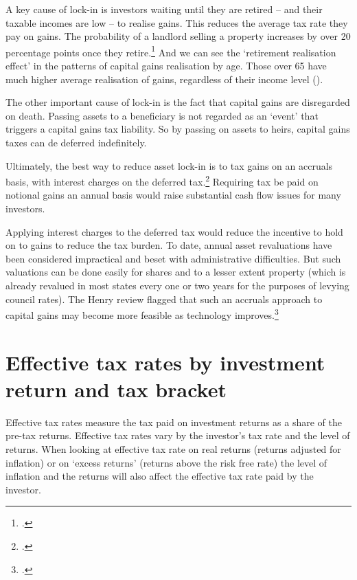 \begin{subappendices}
A key cause of lock-in is investors waiting until they are retired – and their taxable incomes are low – to realise gains. This reduces the average tax rate they pay on gains. The probability of a landlord selling a property increases by over 20 percentage points once they retire.\footcite{WoodOng2010}  And we can see the ‘retirement realisation effect’ in the patterns of capital gains realisation by age. Those over 65 have much higher average realisation of gains, regardless of their income level (). 

The other important cause of lock-in is the fact that capital gains are disregarded on death. Passing assets to a beneficiary is not regarded as an ‘event’ that triggers a capital gains tax liability. So by passing on assets to heirs, capital gains taxes can de deferred indefinitely. 

Ultimately, the best way to reduce asset lock-in is to tax gains on an accruals basis, with interest charges on the deferred tax.\footcites[][11--14]{Burman2009}[][12]{Ingles2009a}  Requiring tax be paid on notional gains an annual basis would raise substantial cash flow issues for many investors. 

Applying interest charges to the deferred tax would reduce the incentive to hold on to gains to reduce the tax burden. To date, annual asset revaluations have been considered impractical and beset with administrative difficulties.  But such valuations can be done easily for shares and to a lesser extent property (which is already revalued in most states every one or two years for the purposes of levying council rates).  The Henry review flagged that such an accruals approach to capital gains may become more feasible as technology improves.\footcite[][64]{HenryTaxReview2010} 



\chapter{Effective tax rates by investment return and tax bracket}\label{appendix:EMTRs}
Effective tax rates measure the tax paid on investment returns as a share of the pre-tax returns. Effective tax rates vary by the investor’s tax rate and the level of returns. When looking at effective tax rate on real returns (returns adjusted for inflation) or on `excess returns' (returns above the risk free rate) the level of inflation and the returns will also affect the effective tax rate paid by the investor. 


\end{subappendices}
